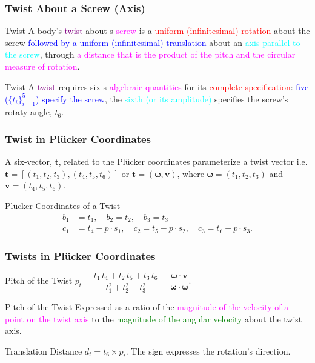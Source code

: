 \begin{frame}
	\frametitle{Twist About a Screw (Axis)}
	\begin{block}{Twist}
		A body's \textcolor{purple}{twist} about 
		s \textcolor{magenta}{screw} is a \textcolor{red}{uniform (infinitesimal) rotation} about the screw \textcolor{blue}{followed by a uniform (infinitesimal) translation} about an \textcolor{cyan}{axis parallel to the screw}, through \textcolor{magenta}{a distance that is the product of the pitch and the circular measure of rotation}.
	\end{block}	
	\begin{block}{Twist}
		A \textcolor{purple}{twist} requires six 
		s \textcolor{magenta}{algebraic quantities} for its  \textcolor{red}{complete specification}:  \textcolor{blue}{five ($\{t_i\}_{i=1}^5$) specify the screw}, the \textcolor{cyan}{sixth (or its amplitude)} specifies the \textcolor{light-blue}{screw's rotaty angle}, $t_6$.
	\end{block}	
\end{frame}

\begin{frame}
	\frametitle{Twist in Pl{\"u}cker Coordinates}
	\begin{definition}
		A six-vector, $\bm{t}$, related to the Pl{\"u}cker coordinates  parameterize a twist vector i.e. $\bm{t}=\left[(t_1, t_2, t_3), (t_4, t_5, t_6)\right]$ or $\bm{t}=\left(\bm{\omega}, \bm{v}\right)$, where $\bm{\omega}=(t_1, t_2, t_3)$ and $\bm{v}=(t_4, t_5, t_6)$.
	\end{definition}
	\begin{block}{Pl{\"u}cker Coordinates of a Twist}
		\begin{align}
			b_1 &= t_1, \quad b_2 = t_2, \quad b_3 = t_3 \\
			c_1 &= t_4 - p \cdot s_1, \quad c_2 = t_5-p\cdot s_2, \quad c_3 = t_6 - p\cdot s_3.
		\end{align}
	\end{block}
\end{frame}

\begin{frame}
	\frametitle{Twists in Pl{\"u}cker Coordinates}
	\begin{block}{Pitch of the Twist}
		$p_t = \dfrac{t_1\,t_4 + t_2 \, t_5 + t_3\,t_6}{t_1^2+t_2^2+t_3^2}=\dfrac{\bm{\omega}\cdot \bm{v}}{\bm{\omega}\cdot \bm{\omega}}$.
	\end{block}
	\begin{block}{Pitch of the Twist}
		Expressed as a ratio of the \textcolor{magenta}{magnitude of the velocity of a point on the twist axis} to the \textcolor{green}{magnitude of the angular velocity} about the twist axis. 
	\end{block}	
	\begin{block}{Translation Distance}
		$d_t = t_6 \times p_t$.  The sign expresses the rotation's direction.
	\end{block}	
\end{frame}


